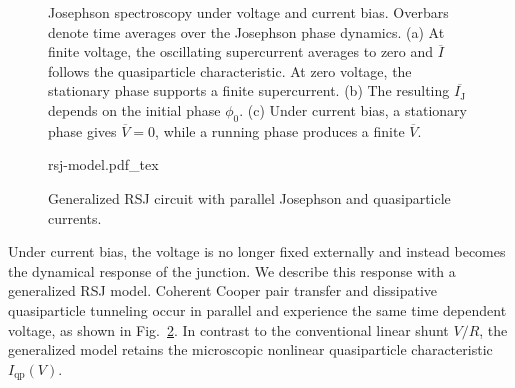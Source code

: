             \begin{figure}[t]
                \captionsetup{format=plain}%
                \centering
                \hfill%
                \hfill%
                \caption{
                    Josephson spectroscopy under voltage and current bias. Overbars denote time averages over the Josephson phase dynamics. (a) At finite voltage, the oscillating supercurrent averages to zero and $\overline{I}$ follows the quasiparticle characteristic. At zero voltage, the stationary phase supports a finite supercurrent. (b) The resulting $\overline{I_\mathrm{J}}$ depends on the initial phase $\phi_0$. (c) Under current bias, a stationary phase gives $\overline{V}=0$, while a running phase produces a finite $\overline{V}$.
                }
                \label{fig:macro:Irsj}
            \end{figure}

            \begin{figure}
                \captionsetup{format=plain}%
                \centering
                \vspace{-0.5em}
                {rsj-model.pdf_tex}
                \caption{
                    Generalized RSJ circuit with parallel Josephson and quasiparticle currents.
                }
                \label{fig:macro:rsj}
            \end{figure}

            Under current bias, the voltage is no longer fixed externally and instead becomes the dynamical response of the junction. We describe this response with a generalized RSJ model. Coherent Cooper pair transfer and dissipative quasiparticle tunneling occur in parallel and experience the same time dependent voltage, as shown in Fig.~\ref{fig:macro:rsj}. In contrast to the conventional linear shunt $V/R$, the generalized model retains the microscopic nonlinear quasiparticle characteristic $I_\mathrm{qp}(V)$. 

